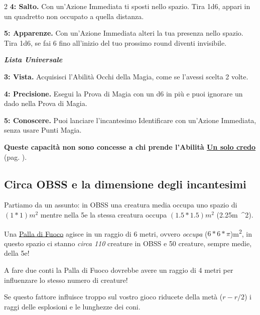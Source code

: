 \begin{multicols}{2}
\textbf{4: Salto.} Con un'Azione Immediata ti sposti nello spazio. Tira 1d6, appari in un quadretto non occupato a quella distanza.

\textbf{5: Apparenze.} Con un'Azione Immediata alteri la tua presenza nello spazio. Tira 1d6, se fai 6 fino all'inizio del tuo prossimo round diventi invisibile.

\emph{\textbf{Lista Universale}}

\textbf{3: Vista.} Acquisisci l'Abilità Occhi della Magia, come se l'avessi scelta 2 volte.

\textbf{4: Precisione.} Esegui la Prova di Magia con un d6 in più e puoi ignorare un dado nella Prova di Magia.

\textbf{5: Conoscere.} Puoi lanciare l'incantesimo Identificare con un'Azione Immediata, senza usare Punti Magia.

\textbf{Queste capacità non sono concesse a chi prende l'Abilità \hyperlink{Un solo credo}{Un solo credo}} (pag. \pageref{Un solo credo}).





\subsection*{Circa OBSS e la dimensione degli incantesimi}

Partiamo da un assunto: in OBSS una creatura media occupa uno spazio di $(1*1)\si{m^{2}}$ mentre nella 5e la stessa creatura occupa $(1.5*1.5)\si{m{^2}}$ (2.25\si{m{^2}}).

Una \hyperlink{Palla di Fuoco}{Palla di Fuoco} agisce in un raggio di 6 metri, ovvero \emph{occupa} ($6*6*\pi$)\si{m^{2}}, in questo spazio ci stanno \emph{circa 110} creature in OBSS e 50 creature, sempre medie, della 5e!

A fare due conti la Palla di Fuoco dovrebbe avere un raggio di 4 metri per influenzare lo stesso numero di creature!

Se questo fattore influisce troppo sul vostro gioco riducete della metà ($r-r/2$) i raggi delle esplosioni e le lunghezze dei coni.

\end{multicols}

